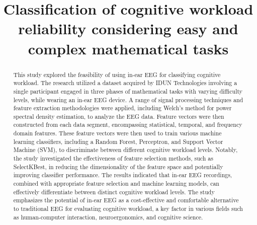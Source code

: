\documentclass[conference]{IEEEtran}
\begin{document}
\title{Classification of cognitive workload reliability considering easy and complex mathematical tasks\\}


\author{
\and
{}

}

\maketitle

\begin{abstract}
This study explored the feasibility of using in-ear EEG for classifying cognitive workload.  The research utilized a dataset acquired by IDUN Technologies involving a single participant engaged in three phases of mathematical tasks with varying difficulty levels, while wearing an in-ear EEG device.  A range of signal processing techniques and feature extraction methodologies were applied, including Welch's method for power spectral density estimation, to analyze the EEG data. Feature vectors were then constructed from each data segment, encompassing statistical, temporal, and frequency domain features.  These feature vectors were then used to train various machine learning classifiers, including a Random Forest, Perceptron, and Support Vector Machine (SVM), to discriminate between different cognitive workload levels. Notably, the study investigated the effectiveness of feature selection methods, such as SelectKBest, in reducing the dimensionality of the feature space and potentially improving classifier performance. The results indicated that in-ear EEG recordings, combined with appropriate feature selection and machine learning models, can effectively differentiate between distinct cognitive workload levels.  The study emphasizes the potential of in-ear EEG as a cost-effective and comfortable alternative to traditional EEG for evaluating cognitive workload, a key factor in various fields such as human-computer interaction, neuroergonomics, and cognitive science. 
\end{abstract}
\end{document}
